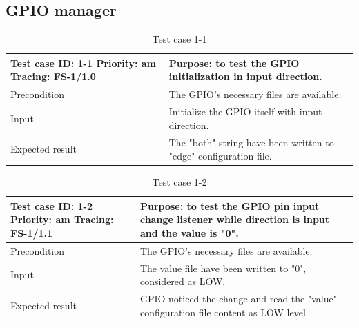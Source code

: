 \subsection{GPIO manager}
\begin{table}[H]
	\caption{Test case 1-1}
	\label{table:TCase-FS1-1}
	\begin{center}
		\renewcommand{\arraystretch}{1.8}
		\begin{tabu} 
			to 0.9 \textwidth
			{  X[0.4, c] X[c] }
			\toprule
			Test case ID: 1-1 \newline Priority: am \newline Tracing: FS-1/1.0 & Purpose: to test the GPIO initialization in input direction.       \\ \midrule
			Precondition                                                       & The GPIO's necessary files are available.                          \\
			Input                                                              & Initialize the GPIO itself with input direction.                  \\
			Expected result                                                    & The "both" string have been written to "edge" configuration file. \\ \bottomrule
		\end{tabu}
	\end{center}
\end{table} 

\begin{table}[H]
	\caption{Test case 1-2}
	\label{table:TCase-FS1-2}
	\begin{center}
		\renewcommand{\arraystretch}{1.8}
		\begin{tabu} 
			to 0.9 \textwidth
			{  X[0.4, c] X[c] }
			\toprule
			Test case ID: 1-2 \newline Priority: am \newline Tracing: FS-1/1.1 & Purpose: to test the GPIO pin input change listener while direction is input and the value is "0". \\ \midrule
			Precondition                                                       & The GPIO's necessary files are available.                                                          \\
			Input                                                              & The value file have been written to "0", considered as LOW.                                       \\
			Expected result                                                    & GPIO noticed the change and read the "value" configuration file content as LOW level.             \\ \bottomrule
		\end{tabu}
	\end{center}
\end{table} 

